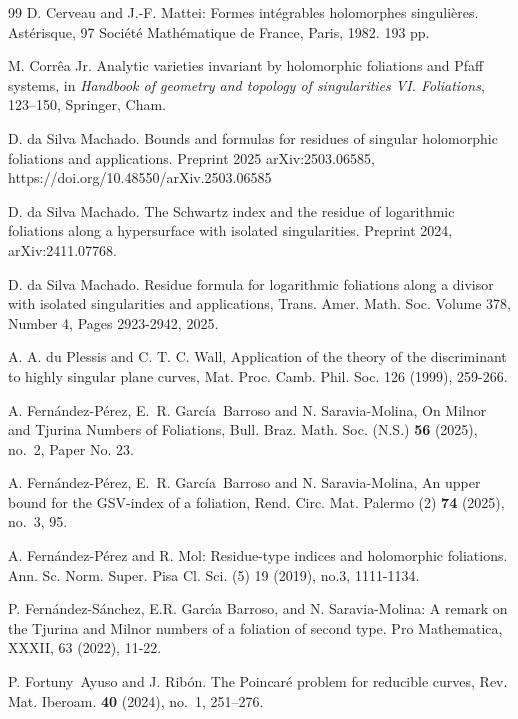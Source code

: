 \documentclass[11pt]{amsart}
\begin{document}
\begin{thebibliography}{99}
D. Cerveau and J.-F. Mattei:
Formes int\'egrables holomorphes singuli\`eres.
Ast\'erisque, 97
Soci\'et\'e Math\'ematique de France, Paris, 1982. 193 pp.


M. Corr\^ea Jr. Analytic varieties invariant by holomorphic foliations and Pfaff systems, in {\it Handbook of geometry and topology of singularities VI. Foliations}, 123--150, Springer, Cham.

D. da Silva Machado. 
Bounds and formulas for residues of singular holomorphic foliations and applications. Preprint 2025	arXiv:2503.06585, 
https://doi.org/10.48550/arXiv.2503.06585

 D. da Silva Machado. The Schwartz index and the residue of logarithmic foliations along a hypersurface with isolated singularities. Preprint 2024, arXiv:2411.07768.

 D. da Silva Machado. Residue formula for logarithmic foliations along a divisor with isolated singularities and applications, Trans. Amer. Math. Soc. Volume 378, Number 4, Pages 2923-2942, 2025.

A. A. du Plessis and C. T. C. Wall, Application of the theory of the discriminant to
highly singular plane curves, Mat. Proc. Camb. Phil. Soc. 126 (1999), 259-266.

A. Fern\'andez-P\'erez, E.~R. Garc\'ia~Barroso and N. Saravia-Molina, On Milnor and Tjurina Numbers of Foliations, Bull. Braz. Math. Soc. (N.S.) {\bf 56} (2025), no.~2, Paper No. 23.


A. Fern\'andez-P\'erez, E.~R. Garc\'ia~Barroso and N. Saravia-Molina, An upper bound for the GSV-index of a foliation, Rend. Circ. Mat. Palermo (2) {\bf 74} (2025), no.~3, 95.


 A. Fern\'andez-P\'erez and R. Mol: Residue-type indices and holomorphic foliations.
Ann. Sc. Norm. Super. Pisa Cl. Sci. (5) 19 (2019), no.3, 1111-1134.

 P. Fern\'andez-S\'anchez, E.R. Garc\'{\i}a Barroso, and N. Saravia-Molina: A remark on the Tjurina and Milnor numbers of a foliation of second type. Pro Mathematica, XXXII, 63 (2022), 11-22. 

P. Fortuny~Ayuso and J. Rib\'on. The Poincar\'e{} problem for reducible curves, Rev. Mat. Iberoam. {\bf 40} (2024), no.~1, 251--276.




\end{thebibliography}
\end{document}
